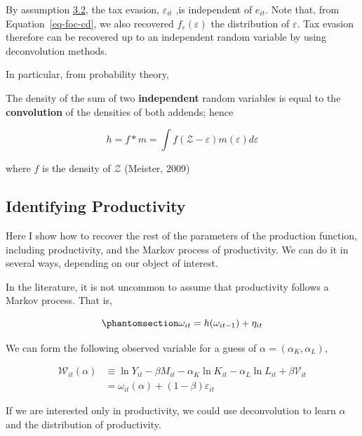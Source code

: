 \documentclass[
  12pt]{article}
\newenvironment{fbx}[3]{\begin{tcolorbox}[enhanced, breakable,%
attach boxed title to top*={xshift=1.4pt},
boxed title style={boxrule=0.0mm, fuzzy shadow={1pt}{-1pt}{0mm}{0.1mm}{gray}, arc=.3em, rounded corners=east, sharp corners=west}, colframe=#1-color2, colbacktitle=#1-color1, colback = white, coltitle=black,  titlerule=0mm, toprule=0pt, bottomrule=.7pt, leftrule=.3em, rightrule=0pt, outer arc=.3em,  arc=0pt,	 sharp corners = east, left=.5em, bottomtitle=1mm, toptitle=1mm,title=\textbf{#2}\hspace{0.5em}{#3}]}
{\end{tcolorbox}}
\begin{document}
By assumption \hyperref[ass-ind]{3.2}, the tax evasion,
\(\varepsilon_{it}\) ,is independent of \(e_{it}\). Note that, from
Equation~\ref{eq-foc-cd}, we also recovered
\(f_{\varepsilon}(\varepsilon)\) the distribution of \(\varepsilon\).
Tax evasion therefore can be recovered up to an independent random
variable by using deconvolution methods.

In particular, from probability theory,

\label{Definition-3.3}
\begin{fbx}{Definition}{Definition 3.3: }{Convolution}
\label{Definition-3.3}
The density of the sum of two \textbf{independent} random variables is
equal to the \textbf{convolution} of the densities of both addends;
hence

\[
h = f*m = \int f(\mathcal Z - \varepsilon)m(\varepsilon)d\varepsilon
\]

where \(f\) is the density of \(\mathcal Z\) (Meister, 2009)

\end{fbx}

\subsection{Identifying Productivity}\label{identifying-productivity}

Here I show how to recover the rest of the parameters of the production
function, including productivity, and the Markov process of
productivity. We can do it in several ways, depending on our object of
interest.

In the literature, it is not uncommon to assume that productivity
follows a Markov process. That is,

\begin{equation}\phantomsection\label{eq-prod-markov}{
    \omega_{it}=h(\omega_{it-1})+\eta_{it}
}\end{equation}

We can form the following observed variable for a guess of
\(\alpha=(\alpha_K,\alpha_L)\),

\[
\begin{aligned}
    \mathcal W_{it}(\alpha) & \equiv \ln Y_{it} - \beta M_{it}-\alpha_K \ln K_{it}-\alpha_L \ln L_{it}+\beta\mathcal{V}_{it}\\
    & = \omega_{it}(\alpha)+(1-\beta)\varepsilon_{it}
\end{aligned}
\]

If we are interested only in productivity, we could use deconvolution to
learn \(\alpha\) and the distribution of productivity.
\end{document}
